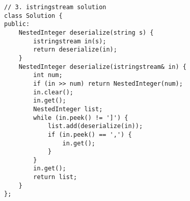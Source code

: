 \begin{lstlisting}
// 3. istringstream solution
class Solution {
public:
    NestedInteger deserialize(string s) {
        istringstream in(s);
        return deserialize(in);
    }
    NestedInteger deserialize(istringstream& in) {
        int num;
        if (in >> num) return NestedInteger(num);
        in.clear();
        in.get();
        NestedInteger list;
        while (in.peek() != ']') {
            list.add(deserialize(in));
            if (in.peek() == ',') {
                in.get();
            }
        }
        in.get();
        return list;
    }
};
\end{lstlisting}

